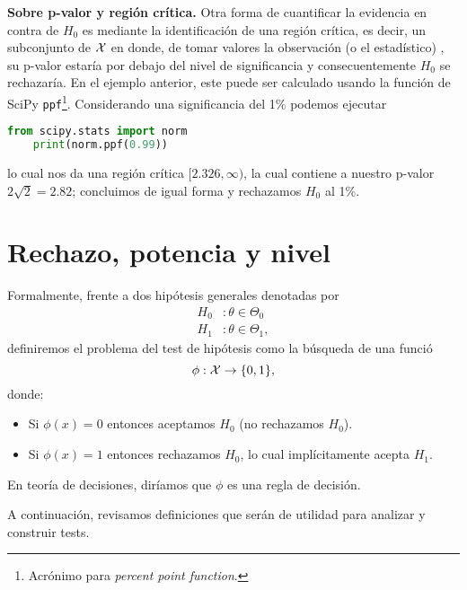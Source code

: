 \textbf{Sobre p-valor y región crítica.}
Otra forma de cuantificar la evidencia en contra de $H_0$ es mediante la identificación de una región crítica, es decir, un subconjunto de ${\mathcal X}$ en donde, de tomar valores la observación (o el estadístico) , su p-valor estaría por debajo del nivel de significancia y consecuentemente $H_0$ se rechazaría. En el ejemplo anterior, este puede ser calculado usando la función de SciPy \texttt{ppf}\footnote{Acrónimo para \emph{percent point function}.}. Considerando una significancia del 1\% podemos ejecutar
\begin{lstlisting}[language=Python]
	from scipy.stats import norm
	print(norm.ppf(0.99))
\end{lstlisting}
lo cual nos da una región crítica $[2.326,\infty)$, la cual contiene a nuestro p-valor $2\sqrt{2} = 2.82$; concluimos de igual forma y rechazamos $H_0$ al 1\%. 




\section{Rechazo, potencia y nivel} 
\label{sec:def_hipótesis}

Formalmente, frente a dos hipótesis generales denotadas por 
\begin{align}
	H_0&: \theta\in\Theta_0\\
	H_1&: \theta\in\Theta_1,
\end{align}
definiremos el problema del test de hipótesis como la búsqueda de una funció
\begin{equation}
	\phi:{\mathcal X}\rightarrow \{0,1\},
\end{equation}
donde:
\begin{itemize}
	\item Si $\phi(x)=0$ entonces aceptamos $H_0$ (no rechazamos $H_0$).
	\item Si $\phi(x)=1$ entonces rechazamos $H_0$, lo cual implícitamente acepta $H_1$. 
\end{itemize}
En teoría de decisiones, diríamos que $\phi$ es una regla de decisión. 

A continuación, revisamos definiciones que serán de utilidad para analizar y construir tests. 


